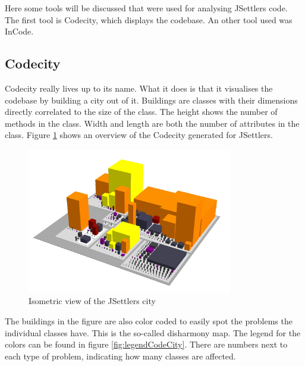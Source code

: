 \documentclass[pdftex12pt, a4paper]{article}
\begin{document}
Here some tools will be discussed that were used for analysing JSettlers code. The first tool is Codecity, which displays the codebase. An other tool used was InCode.

\subsection{Codecity}

Codecity really lives up to its name. What it does is that it visualises the codebase by building a city out of it. Buildings are classes with their dimensions directly correlated to the size of the class. The height shows the number of methods in the class. Width and length are both the number of attributes in the class. Figure \ref{fig:codecityIso} shows an overview of the Codecity generated for JSettlers.

\begin{figure}
\begin{center}
\includegraphics[width=0.8\textwidth]{Image/Codecity/Codecity2.jpg}
\caption{Isometric view of the JSettlers city}
\label{fig:codecityIso}
\end{center}
\end{figure}

The buildings in the figure are also color coded to easily spot the problems the individual classes have. This is the so-called disharmony map. The legend for the colors can be found in figure \ref{fig:legendCodeCity}. There are numbers next to each type of problem, indicating how many classes are affected.
\end{document}
